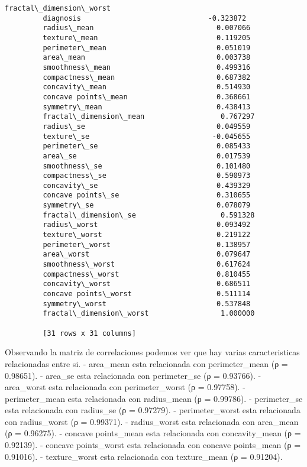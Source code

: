 \documentclass[11pt]{article}
\begin{document}
\begin{Verbatim}[commandchars=\\\{\}]
                                  fractal\_dimension\_worst  
         diagnosis                              -0.323872  
         radius\_mean                             0.007066  
         texture\_mean                            0.119205  
         perimeter\_mean                          0.051019  
         area\_mean                               0.003738  
         smoothness\_mean                         0.499316  
         compactness\_mean                        0.687382  
         concavity\_mean                          0.514930  
         concave points\_mean                     0.368661  
         symmetry\_mean                           0.438413  
         fractal\_dimension\_mean                  0.767297  
         radius\_se                               0.049559  
         texture\_se                             -0.045655  
         perimeter\_se                            0.085433  
         area\_se                                 0.017539  
         smoothness\_se                           0.101480  
         compactness\_se                          0.590973  
         concavity\_se                            0.439329  
         concave points\_se                       0.310655  
         symmetry\_se                             0.078079  
         fractal\_dimension\_se                    0.591328  
         radius\_worst                            0.093492  
         texture\_worst                           0.219122  
         perimeter\_worst                         0.138957  
         area\_worst                              0.079647  
         smoothness\_worst                        0.617624  
         compactness\_worst                       0.810455  
         concavity\_worst                         0.686511  
         concave points\_worst                    0.511114  
         symmetry\_worst                          0.537848  
         fractal\_dimension\_worst                 1.000000  
         
         [31 rows x 31 columns]
\end{Verbatim}
            
    Observando la matriz de correlaciones podemos ver que hay varias
caracteristicas relacionadas entre si. - area\_mean esta relacionada con
perimeter\_mean (ρ = 0.98651). - area\_se esta relacionada con
perimeter\_se (ρ = 0.93766). - area\_worst esta relacionada con
perimeter\_worst (ρ = 0.97758). - perimeter\_mean esta relacionada con
radius\_mean (ρ = 0.99786). - perimeter\_se esta relacionada con
radius\_se (ρ = 0.97279). - perimeter\_worst esta relacionada con
radius\_worst (ρ = 0.99371). - radius\_worst esta relacionada con
area\_mean (ρ = 0.96275). - concave points\_mean esta relacionada con
concavity\_mean (ρ = 0.92139). - concave points\_worst esta relacionada
con concave points\_mean (ρ = 0.91016). - texture\_worst esta
relacionada con texture\_mean (ρ = 0.91204).
\end{document}
